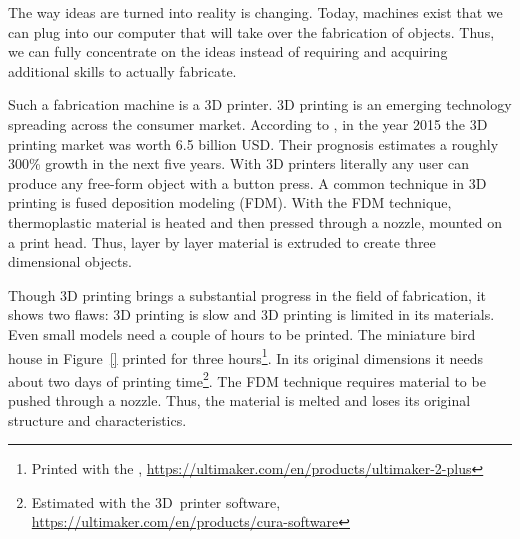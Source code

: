 \documentclass[../ClassicThesis.tex]{subfiles}
\begin{document}
The way ideas are turned into reality is changing. Today, machines
exist that we can plug into our computer that will take over the
fabrication of objects. Thus, we can fully concentrate on the ideas
instead of requiring and acquiring additional skills to actually
fabricate.


Such a fabrication machine is a 3D printer. 3D printing is an emerging
technology spreading across the consumer market. According to
, in the year 2015 the 3D printing market was
worth 6.5 billion USD. Their prognosis estimates a roughly 300\%
growth in the next five years\cite{wohlers-market}. With 3D printers
literally any user can produce any free-form object with a button
press. A common technique in 3D printing is fused deposition modeling
(FDM)\cite{}. With the FDM technique,
thermoplastic material is heated and then pressed through a nozzle,
mounted on a print head. Thus, layer by layer material is extruded to
create three dimensional objects\cite{}.

Though 3D printing brings a substantial progress in the field of
fabrication, it shows two flaws: 3D printing is slow and 3D printing
is limited in its materials. Even small models need a couple of hours
to be printed. The miniature bird house in Figure~\ref{}
printed for three hours\footnote{Printed with the ,
  \url{https://ultimaker.com/en/products/ultimaker-2-plus}}. In its
original dimensions it needs about two days of printing
time\footnote{Estimated with the  3D~printer software,
  \url{https://ultimaker.com/en/products/cura-software}}. The FDM
technique requires material to be pushed through a nozzle. Thus, the
material is melted and loses its original structure and
characteristics.


\end{document}

